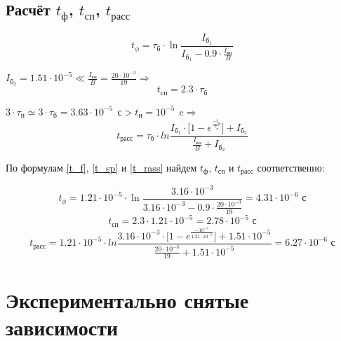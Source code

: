 \subsection{Расчёт $t_\text{ф}$, $t_\text{сп}$, $t_\text{расс}$}

\begin{equation}
\label{t_f}
t_\phi = \tau_{\text{б}} \cdot \ln{\frac{I_{\text{б}_1}}{I_{\text{б}_1} - 0.9 \cdot \frac{I_\text{кн}}{B}}}
\end{equation}

$I_{\text{б}_2} = 1.51 \cdot 10^{-5} \ll \frac{I_\text{кн}}{B} = \frac{20 \cdot 10^{-3}}{19} \Rightarrow$
\begin{equation}
\label{t_sp}
t_\text{сп} = 2.3 \cdot \tau_\text{б}
\end{equation}

$3 \cdot \tau_\text{н} \simeq 3 \cdot \tau_{\text{б}} = 3.63 \cdot 10^{-5}\ \ \text{с} > t_\text{и} = 10^{-5}\ \ \text{c} \Rightarrow$
\begin{equation}
\label{t_rass}
t_\text{расс} = \tau_{\text{б}} \cdot ln{\frac{I_{\text{б}_1} \cdot \Big [ 1 - e^{\frac{-t_\text{и}}{\tau_\text{н}}} \Big ] + I_{\text{б}_2}}{\frac{I_\text{кн}}{B} + I_{\text{б}_2}}}
\end{equation}

По формулам \ref{t_f}, \ref{t_sp} и \ref{t_rass} найдем $t_\text{ф}$, $t_\text{сп}$ и $t_\text{расс}$ соответственно:

\begin{displaymath}
t_\phi = 1.21 \cdot 10^{-5} \cdot \ln{\frac{3.16 \cdot 10^{-3}}{3.16 \cdot 10^{-3} - 0.9 \cdot \frac{20 \cdot 10^{-3}}{19}}} = 4.31 \cdot 10^{-6} \text{ с}
\end{displaymath}
\begin{displaymath}
t_\text{сп} = 2.3 \cdot 1.21 \cdot 10^{-5} = 2.78 \cdot 10^{-5} \text{ с}
\end{displaymath}
\begin{displaymath}
t_\text{расс} = 1.21 \cdot 10^{-5} \cdot ln{\frac{3.16 \cdot 10^{-3} \cdot \Big [ 1 - e^{\frac{-10^{-5}}{1.21 \cdot 10^{-5}}} \Big ] + 1.51 \cdot 10^{-5}}{\frac{20 \cdot 10^{-3}}{19} + 1.51 \cdot 10^{-5}}} = 6.27 \cdot 10^{-6} \text{ с}
\end{displaymath}

\section{Экспериментально снятые зависимости}

